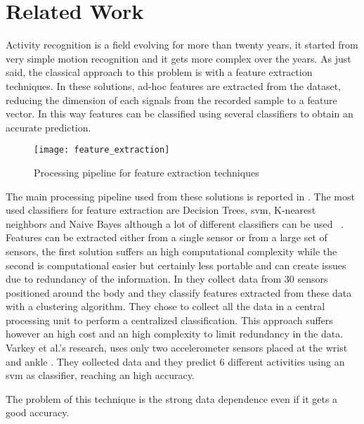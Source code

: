
\section{Related Work}
\label{sec:related_work}

Activity recognition is a field evolving for more than twenty years, it started from very simple motion recognition and it gets more complex over the years.
As just said, the classical approach to this problem is with a feature extraction techniques.
In these solutions, ad-hoc features are extracted from the dataset, reducing the dimension of each signals from the recorded sample to a feature vector.
In this way features can be classified using several classifiers to obtain an accurate prediction.

\begin{figure}[!ht]
  \centering
  \texttt{[image: feature\_extraction]}
  \caption{Processing pipeline for feature extraction techniques}
  \label{fig:feature_extraction}
\end{figure}

The main processing pipeline used from these solutions is reported in .
The most used classifiers for feature extraction are Decision Trees, \gls{svm}, K-nearest neighbors and Naive Bayes although a lot of different classifiers can be used ~\cite{Ravi05}.
Features can be extracted either from a single sensor or from a large set of sensors, the first solution suffers an high computational complexity while the second is computational easier but certainly less portable and can create issues due to redundancy of the information.
In \cite{Laerhoven02} they collect data from 30 sensors positioned around the body and they classify features extracted from these data with a clustering algorithm. They chose to collect all the data in a central processing unit to perform a centralized classification. This approach suffers however an high cost and an high complexity to limit redundancy in the data.
Varkey et al.'s research, uses only two accelerometer sensors placed at the wrist and ankle \cite{Varkey2012}. They collected data and they predict 6 different activities using an \gls{svm} as classifier, reaching an high accuracy.

The problem of this technique is the strong data dependence even if it gets a good accuracy.


